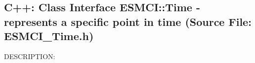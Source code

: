  
\setlength{\oldparskip}{\parskip}
\setlength{\parskip}{1.5ex}
\setlength{\oldparindent}{\parindent}
\setlength{\parindent}{0pt}
\setlength{\oldbaselineskip}{\baselineskip}
\setlength{\baselineskip}{11pt}
 
\def\bv{\begin{verbatim}}
\def\ev{\end{verbatim}}
\def\be{\begin{equation}}
\def\ee{\end{equation}}
\def\bea{\begin{eqnarray}}
\def\eea{\end{eqnarray}}
\def\bi{\begin{itemize}}
\def\ei{\end{itemize}}
\def\bn{\begin{enumerate}}
\def\en{\end{enumerate}}
\def\bd{\begin{description}}
\def\ed{\end{description}}
\def\({\left (}
\def\){\right )}
\def\[{\left [}
\def\]{\right ]}
\def\<{\left  \langle}
\def\>{\right \rangle}
\def\cI{{\cal I}}
\def\diag{\mathop{\rm diag}}
\def\tr{\mathop{\rm tr}}


 
\subsection{C++:  Class Interface ESMCI::Time - represents a specific point in time (Source File: ESMCI\_Time.h)}


  
{\sf DESCRIPTION:\\ }


